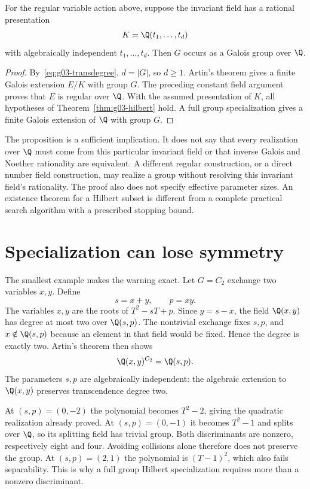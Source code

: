 \begin{proposition}
\label{prop:g03-noether-route}
For the regular variable action above, suppose the invariant field has a rational presentation
\[
K=\Q(t_1,\ldots,t_d)
\]
with algebraically independent $t_1,\ldots,t_d$. Then $G$ occurs as a Galois group over $\Q$.
\end{proposition}

\begin{proof}
By~\eqref{eq:g03-transdegree}, $d=|G|$, so $d\ge1$. Artin's theorem gives a finite Galois extension $E/K$ with group $G$. The preceding constant field argument proves that $E$ is regular over $\Q$. With the assumed presentation of $K$, all hypotheses of Theorem~\ref{thm:g03-hilbert} hold. A full group specialization gives a finite Galois extension of $\Q$ with group $G$.
\end{proof}

The proposition is a sufficient implication. It does not say that every realization over $\Q$ must come from this particular invariant field or that inverse Galois and Noether rationality are equivalent. A different regular construction, or a direct number field construction, may realize a group without resolving this invariant field's rationality. The proof also does not specify effective parameter sizes. An existence theorem for a Hilbert subset is different from a complete practical search algorithm with a prescribed stopping bound.

\section{Specialization can lose symmetry}

The smallest example makes the warning exact. Let $G=C_2$ exchange two variables $x,y$. Define
\[
s=x+y,\qquad p=xy.
\]
The variables $x,y$ are the roots of $T^2-sT+p$. Since $y=s-x$, the field $\Q(x,y)$ has degree at most two over $\Q(s,p)$. The nontrivial exchange fixes $s,p$, and $x\notin\Q(s,p)$ because an element in that field would be fixed. Hence the degree is exactly two. Artin's theorem then shows
\[
\Q(x,y)^{C_2}=\Q(s,p).
\]
The parameters $s,p$ are algebraically independent: the algebraic extension to $\Q(x,y)$ preserves transcendence degree two.

At $(s,p)=(0,-2)$ the polynomial becomes $T^2-2$, giving the quadratic realization already proved. At $(s,p)=(0,-1)$ it becomes $T^2-1$ and splits over $\Q$, so its splitting field has trivial group. Both discriminants are nonzero, respectively eight and four. Avoiding collisions alone therefore does not preserve the group. At $(s,p)=(2,1)$ the polynomial is $(T-1)^2$, which also fails separability. This is why a full group Hilbert specialization requires more than a nonzero discriminant.

